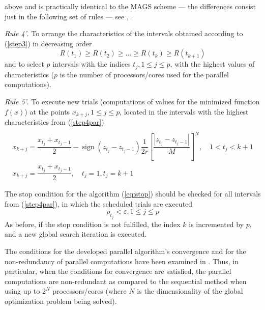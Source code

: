 \documentclass{gOMS2e}
\theoremstyle{plain}%
\theoremstyle{definition}
\DeclareMathOperator{\sign}{sign}
\theoremstyle{remark}
\begin{document}
above and is practically identical to the MAGS scheme --- the differences consist just in the
following set of rules --- see \cite{strSergGO}, \cite{stronginGergelBarkalovParGO}.
\par
\textit{Rule 4'}. To arrange the characteristics of the intervals obtained according to (\ref{step3}) in decreasing order
\begin{equation}
\label{step4par}
R(t_1)\geqslant R(t_2)\geqslant \dots \geqslant R(t_{k})\geqslant R(t_{k+1})
\end{equation}
and to select \(p\) intervals with the indices \(t_j,1\leqslant j\leqslant p\), with
the highest values of characteristics (\(p\) is the number of processors/cores used for the parallel computations).
\par
\textit{Rule 5'}. To execute new trials (computations of values for the minimized
function \(f(x)\)) at the points \(x_{k+j},1\leqslant j\leqslant p\), located in the
intervals with the highest characteristics from (\ref{step4par})
\begin{equation}
\label{step5par}
\begin{array}{cr}\\
x_{k+j}=\dfrac{x_{t_j}+x_{t_j-1}}{2}-\sign(z_{t_j}-z_{t_j-1})\dfrac{1}{2r}\left[\dfrac{|z_{t_j}-z_{t_j-1}|}{M}\right]^N,\quad 1<t_j<k+1 \\
x_{k+j}=\dfrac{x_{t_j}+x_{t_j-1}}{2},\quad t_j=1,t_j=k+1
\end{array}
\end{equation}
\par
The stop condition for the algorithm (\ref{eq:stop}) should be checked for all
intervals from (\ref{step4par}), in which the scheduled trials are executed
\begin{equation}
  \label{eq:stop}
\rho_{t_j}<\varepsilon,1\leqslant j\leqslant p
\end{equation}
As before, if the stop condition is not fulfilled, the index \(k\) is
incremented by \(p\), and a new global search iteration is executed.
\par
The conditions for the developed parallel algorithm’s convergence and for the
non-redundancy of parallel computations have been examined in \cite{strSergGO}.
Thus, in particular, when the conditions for convergence are satisfied, the parallel
computations are non-redundant as compared to the sequential method when using up to
\(2^N\) processors/cores (where \(N\) is the dimensionality of the global optimization problem being solved).
\end{document}
